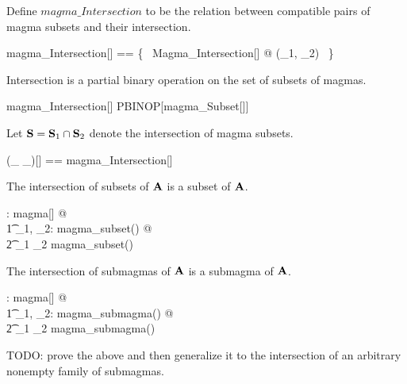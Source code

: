 \documentclass{amsart}
\begin{document}
Define $magma\_Intersection$ to be the relation between compatible pairs of magma subsets
and their intersection.

\begin{zed}
	magma\_Intersection[\genT] == \{~ Magma\_Intersection[\genT] @ (\strucS_1, \strucS_2) \mapsto \strucS ~\}
\end{zed}

\begin{remark}
Intersection is a partial binary operation on the set of subsets of magmas.

\begin{zed}
	magma\_Intersection[\setT] \in PBINOP[magma\_Subset[\setT]]
\end{zed}

\end{remark}

Let $\mathbf{S} = \mathbf{S}_1 \mathbin{\cap} \mathbf{S}_2$ denote the intersection of magma subsets.

\begin{zed}
	(\_ \capMagma \_)[\genT] == magma\_Intersection[\genT]
\end{zed}

\begin{remark}
The intersection of subsets of $\mathbf{A}$ is a subset of $\mathbf{A}$.

\begin{zed}
	\forall \strucA: magma[\setT] @ \\
	\t1	\forall \strucS_1, \strucS_2: magma\_subset(\strucA) @ \\
	\t2		\strucS_1 \capMagma \strucS_2 \in magma\_subset(\strucA)
\end{zed}

\end{remark}

\begin{remark}
The intersection of submagmas of $\mathbf{A}$ is a submagma of $\mathbf{A}$.

\begin{zed}
	\forall \strucA: magma[\setT] @ \\
	\t1	\forall \strucS_1, \strucS_2: magma\_submagma(\strucA) @ \\
	\t2		\strucS_1 \capMagma \strucS_2 \in magma\_submagma(\strucA)
\end{zed}

\end{remark}

TODO: prove the above and then generalize it to the intersection of an arbitrary
nonempty family of submagmas.
\end{document}
